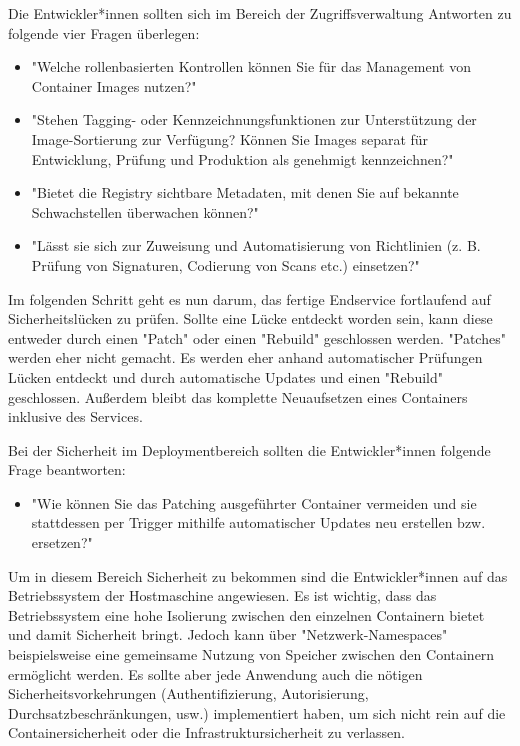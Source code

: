 Die Entwickler*innen sollten sich im Bereich der Zugriffsverwaltung Antworten zu folgende vier Fragen überlegen:

\begin{itemize}
    \item "Welche rollenbasierten Kontrollen können Sie für das Management von Container Images nutzen?" \cite{ContainerSecurity}
    \item "Stehen Tagging- oder Kennzeichnungsfunktionen zur Unterstützung der Image-Sortierung zur Verfügung? Können Sie Images separat für Entwicklung, Prüfung und Produktion als genehmigt kennzeichnen?" \cite{ContainerSecurity}
    \item "Bietet die Registry sichtbare Metadaten, mit denen Sie auf bekannte Schwachstellen überwachen können?" \cite{ContainerSecurity}
    \item "Lässt sie sich zur Zuweisung und Automatisierung von Richtlinien (z. B. Prüfung von Signaturen, Codierung von Scans etc.) einsetzen?" \cite{ContainerSecurity}
\end{itemize}


Im folgenden Schritt geht es nun darum, das fertige Endservice fortlaufend auf Sicherheitslücken zu prüfen. Sollte eine Lücke entdeckt worden sein, kann diese entweder durch einen "Patch" oder einen "Rebuild" geschlossen werden. "Patches" werden eher nicht gemacht. Es werden eher anhand automatischer Prüfungen Lücken entdeckt und durch automatische Updates und einen "Rebuild" geschlossen. Außerdem bleibt das komplette Neuaufsetzen eines Containers inklusive des Services. \cite{ContainerSecurity}

Bei der Sicherheit im Deploymentbereich sollten die Entwickler*innen folgende Frage beantworten:

\begin{itemize}
    \item "Wie können Sie das Patching ausgeführter Container vermeiden und sie stattdessen per Trigger mithilfe automatischer Updates neu erstellen bzw. ersetzen?" \cite{ContainerSecurity}
\end{itemize}

\cite{ContainerSecurity}


Um in diesem Bereich Sicherheit zu bekommen sind die Entwickler*innen auf das Betriebssystem der Hostmaschine angewiesen. Es ist wichtig, dass das Betriebssystem eine hohe Isolierung zwischen den einzelnen Containern bietet und damit Sicherheit bringt. Jedoch kann über "Netzwerk-Namespaces" beispielsweise eine gemeinsame Nutzung von Speicher zwischen den Containern ermöglicht werden. Es sollte aber jede Anwendung auch die nötigen Sicherheitsvorkehrungen (Authentifizierung, Autorisierung, Durchsatzbeschränkungen, usw.) implementiert haben, um sich nicht rein auf die Containersicherheit oder die Infrastruktursicherheit zu verlassen. \cite{ContainerSecurity}

